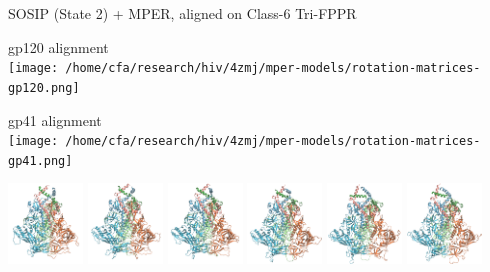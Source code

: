 \begin{frame}[fragile]{SOSIP (State 2) + MPER, aligned on Class-6 Tri-FPPR}
    \begin{center}
        \begin{minipage}{0.47\textwidth}
            \begin{center}
                gp120 alignment\\
                \texttt{[image: /home/cfa/research/hiv/4zmj/mper-models/rotation-matrices-gp120.png]}
            \end{center}
        \end{minipage}
        \begin{minipage}{0.47\textwidth}
            \begin{center}
                gp41 alignment\\
                \texttt{[image: /home/cfa/research/hiv/4zmj/mper-models/rotation-matrices-gp41.png]}
            \end{center}
        \end{minipage}

    \includegraphics[width=0.149\textwidth]{ppt/media/image5.png}
    \includegraphics[width=0.149\textwidth]{ppt/media/image6.png}
    \includegraphics[width=0.149\textwidth]{ppt/media/image7.png}
    \includegraphics[width=0.149\textwidth]{ppt/media/image8.png}
    \includegraphics[width=0.149\textwidth]{ppt/media/image9.png}
    \includegraphics[width=0.149\textwidth]{ppt/media/image11.png}


\end{center}
\end{frame}
